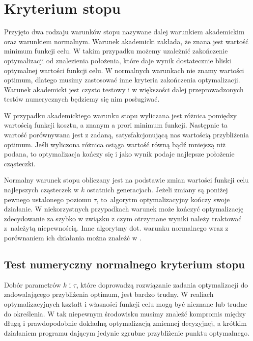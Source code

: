 \documentclass[11pt, a4paper, oneside]{article}
\begin{document}
\section{Kryterium stopu} \label{sec:stop}

Przyjęto dwa rodzaju warunków stopu nazywane dalej warunkiem akademickim oraz warunkiem normalnym. Warunek akademicki zakłada, że znana jest wartość minimum funkcji celu. W takim przypadku możemy uzależnić zakończenie optymalizacji od znalezienia położenia, które daje wynik dostatecznie bliski optymalnej wartości funkcji celu. W normalnych warunkach nie znamy wartości optimum, dlatego musimy zastosować inne kryteria zakończenia optymalizacji. Warunek akademicki jest czysto testowy i w większości dalej przeprowadzonych testów numerycznych będziemy się nim posługiwać.

W przypadku akademickiego warunku stopu wyliczana jest różnica pomiędzy wartością funkcji kosztu, a znanym a prori minimum funkcji. Następnie ta wartość porównywana jest z zadaną, satysfakcjonującą nas wartością przybliżenia optimum. Jeśli wyliczona różnica osiąga wartość równą bądź mniejszą niż podana, to optymalizacja kończy się i jako wynik podaje najlepsze położenie cząsteczki.

Normalny warunek stopu obliczany jest na podstawie zmian wartości funkcji celu najlepszych cząsteczek w $k$ ostatnich generacjach. Jeżeli zmiany są poniżej pewnego ustalonego poziomu $\tau$, to~algorytm optymalizacyjny kończy swoje działanie. W niekorzystnych przypadkach warunek może kończyć optymalizację zdecydowanie za szybko w związku z czym otrzymane wyniki należy traktować z~należytą niepewnością. Inne algorytmy dot. warunku normalnego wraz z porównaniem ich działania można znaleźć w \cite{karinZielinski}.

\subsection*{Test numeryczny normalnego kryterium stopu}

Dobór parametrów $k$ i $\tau$, które doprowadzą rozwiązanie zadania optymalizacji do zadowalającego przybliżenia optimum, jest bardzo trudny. W realiach optymalizacyjnych kształt i własności funkcji celu mogą być nieznane lub trudne do określenia. W tak niepewnym środowisku musimy znaleźć kompromis między długą i prawdopodobnie dokładną optymalizacją zmiennej decyzyjnej, a krótkim działaniem programu dającym jedynie zgrubne przybliżenie punktu optymalnego.
\end{document}
